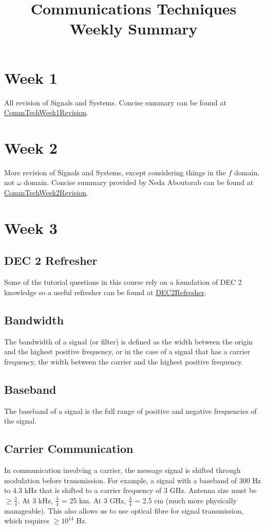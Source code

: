 \documentclass[journal]{IEEEtran}
\begin{document}
\title{Communications Techniques Weekly Summary}
{}
\maketitle

\section{Week 1}
All revision of Signals and Systems. Concise summary can be found at \href{https://github.com/jakemyork/Semester-2-2018-Weekly-Summaries/blob/master/CommTechWeek1Revision.pdf}{CommTechWeek1Revision}.

\section{Week 2}
More revision of Signals and Systems, except considering things in the $f$ domain, not $\omega$ domain. Concise summary provided by Neda Aboutorab can be found at \href{https://github.com/jakemyork/Semester-2-2018-Weekly-Summaries/blob/master/CommTechWeek2Revision.pdf}{CommTechWeek2Revision}.

\section{Week 3}
\subsection{DEC 2 Refresher}
Some of the tutorial questions in this course rely on a foundation of DEC 2 knowledge so a useful refresher can be found at \href{https://github.com/jakemyork/Semester-2-2018-Weekly-Summaries/blob/master/DEC2Refresher.pdf}{DEC2Refresher}.
\subsection{Bandwidth}
The bandwidth of a signal (or filter) is defined as the width between the origin and the highest positive frequency, or in the case of a signal that has a carrier frequency, the width between the carrier and the highest positive frequency.
\subsection{Baseband}
The baseband of a signal is the full range of positive and negative frequencies of the signal.
\subsection{Carrier Communication}
In communication involving a carrier, the message signal is shifted through modulation before transmission. For example, a signal with a baseband of 300 Hz to 4.3 kHz that is shifted to a carrier frequency of 3 GHz.
\linebreak\linebreak
Antenna size must be $\geq \frac{\lambda}{4}$. At 3 kHz, $\frac{\lambda}{4}$ = 25 km. At 3 GHz, $\frac{\lambda}{4}$ = 2.5 cm (much more physically manageable). This also allows us to use optical fibre for signal transmission, which requires $\geq 10^{14}$ Hz.
\end{document}
